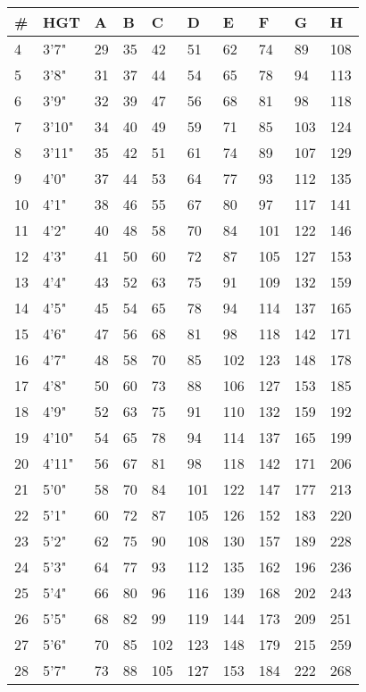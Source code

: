 \documentclass{article}
\begin{document}
\begin{longtable}{@{} l l l l l l l l l l}
\small
\textbf{\#} & \textbf{HGT} & \textbf{A} & \textbf{B} & \textbf{C} & \textbf{D} & \textbf{E} & \textbf{F} & \textbf{G} & \textbf{H}\\
\midrule
4 & 3'7" & 29 & 35 & 42 & 51 & 62 & 74 & 89 & 108\\
5 & 3'8" & 31 & 37 & 44 & 54 & 65 & 78 & 94 & 113\\
6 & 3'9" & 32 & 39 & 47 & 56 & 68 & 81 & 98 & 118\\
7 & 3'10" & 34 & 40 & 49 & 59 & 71 & 85 & 103 & 124\\
8 & 3'11" & 35 & 42 & 51 & 61 & 74 & 89 & 107 & 129\\
9 & 4'0" & 37 & 44 & 53 & 64 & 77 & 93 & 112 & 135\\
10 & 4'1" & 38 & 46 & 55 & 67 & 80 & 97 & 117 & 141\\
11 & 4'2" & 40 & 48 & 58 & 70 & 84 & 101 & 122 & 146\\
12 & 4'3" & 41 & 50 & 60 & 72 & 87 & 105 & 127 & 153\\
13 & 4'4" & 43 & 52 & 63 & 75 & 91 & 109 & 132 & 159\\
14 & 4'5" & 45 & 54 & 65 & 78 & 94 & 114 & 137 & 165\\
15 & 4'6" & 47 & 56 & 68 & 81 & 98 & 118 & 142 & 171\\
16 & 4'7" & 48 & 58 & 70 & 85 & 102 & 123 & 148 & 178\\
17 & 4'8" & 50 & 60 & 73 & 88 & 106 & 127 & 153 & 185\\
18 & 4'9" & 52 & 63 & 75 & 91 & 110 & 132 & 159 & 192\\
19 & 4'10" & 54 & 65 & 78 & 94 & 114 & 137 & 165 & 199\\
20 & 4'11" & 56 & 67 & 81 & 98 & 118 & 142 & 171 & 206\\
21 & 5'0" & 58 & 70 & 84 & 101 & 122 & 147 & 177 & 213\\
22 & 5'1" & 60 & 72 & 87 & 105 & 126 & 152 & 183 & 220\\
23 & 5'2" & 62 & 75 & 90 & 108 & 130 & 157 & 189 & 228\\
24 & 5'3" & 64 & 77 & 93 & 112 & 135 & 162 & 196 & 236\\
25 & 5'4" & 66 & 80 & 96 & 116 & 139 & 168 & 202 & 243\\
26 & 5'5" & 68 & 82 & 99 & 119 & 144 & 173 & 209 & 251\\
27 & 5'6" & 70 & 85 & 102 & 123 & 148 & 179 & 215 & 259\\
28 & 5'7" & 73 & 88 & 105 & 127 & 153 & 184 & 222 & 268\\

\end{longtable}
\end{document}
